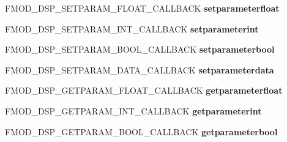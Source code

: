 \begin{DoxyCompactItemize}
\item 
\hypertarget{struct_f_m_o_d___d_s_p___d_e_s_c_r_i_p_t_i_o_n_a29e99ce5530bbb8863b877a8fa3ba07f}{F\+M\+O\+D\+\_\+\+D\+S\+P\+\_\+\+S\+E\+T\+P\+A\+R\+A\+M\+\_\+\+F\+L\+O\+A\+T\+\_\+\+C\+A\+L\+L\+B\+A\+C\+K {\bfseries setparameterfloat}}\label{struct_f_m_o_d___d_s_p___d_e_s_c_r_i_p_t_i_o_n_a29e99ce5530bbb8863b877a8fa3ba07f}

\item 
\hypertarget{struct_f_m_o_d___d_s_p___d_e_s_c_r_i_p_t_i_o_n_a2f545fba54c593711a6dd633c1d9d10b}{F\+M\+O\+D\+\_\+\+D\+S\+P\+\_\+\+S\+E\+T\+P\+A\+R\+A\+M\+\_\+\+I\+N\+T\+\_\+\+C\+A\+L\+L\+B\+A\+C\+K {\bfseries setparameterint}}\label{struct_f_m_o_d___d_s_p___d_e_s_c_r_i_p_t_i_o_n_a2f545fba54c593711a6dd633c1d9d10b}

\item 
\hypertarget{struct_f_m_o_d___d_s_p___d_e_s_c_r_i_p_t_i_o_n_a8173e7f35101d5aedd2f8f4933815688}{F\+M\+O\+D\+\_\+\+D\+S\+P\+\_\+\+S\+E\+T\+P\+A\+R\+A\+M\+\_\+\+B\+O\+O\+L\+\_\+\+C\+A\+L\+L\+B\+A\+C\+K {\bfseries setparameterbool}}\label{struct_f_m_o_d___d_s_p___d_e_s_c_r_i_p_t_i_o_n_a8173e7f35101d5aedd2f8f4933815688}

\item 
\hypertarget{struct_f_m_o_d___d_s_p___d_e_s_c_r_i_p_t_i_o_n_a8f55fa30236a5117cec1d18622b4ffc1}{F\+M\+O\+D\+\_\+\+D\+S\+P\+\_\+\+S\+E\+T\+P\+A\+R\+A\+M\+\_\+\+D\+A\+T\+A\+\_\+\+C\+A\+L\+L\+B\+A\+C\+K {\bfseries setparameterdata}}\label{struct_f_m_o_d___d_s_p___d_e_s_c_r_i_p_t_i_o_n_a8f55fa30236a5117cec1d18622b4ffc1}

\item 
\hypertarget{struct_f_m_o_d___d_s_p___d_e_s_c_r_i_p_t_i_o_n_a50888c2a42b0a95ed7bcfb9488ec8d4f}{F\+M\+O\+D\+\_\+\+D\+S\+P\+\_\+\+G\+E\+T\+P\+A\+R\+A\+M\+\_\+\+F\+L\+O\+A\+T\+\_\+\+C\+A\+L\+L\+B\+A\+C\+K {\bfseries getparameterfloat}}\label{struct_f_m_o_d___d_s_p___d_e_s_c_r_i_p_t_i_o_n_a50888c2a42b0a95ed7bcfb9488ec8d4f}

\item 
\hypertarget{struct_f_m_o_d___d_s_p___d_e_s_c_r_i_p_t_i_o_n_a4dbf5dfd6b3b972456d7843fa32cd2be}{F\+M\+O\+D\+\_\+\+D\+S\+P\+\_\+\+G\+E\+T\+P\+A\+R\+A\+M\+\_\+\+I\+N\+T\+\_\+\+C\+A\+L\+L\+B\+A\+C\+K {\bfseries getparameterint}}\label{struct_f_m_o_d___d_s_p___d_e_s_c_r_i_p_t_i_o_n_a4dbf5dfd6b3b972456d7843fa32cd2be}

\item 
\hypertarget{struct_f_m_o_d___d_s_p___d_e_s_c_r_i_p_t_i_o_n_a0667147f4214b4040333005911d03d25}{F\+M\+O\+D\+\_\+\+D\+S\+P\+\_\+\+G\+E\+T\+P\+A\+R\+A\+M\+\_\+\+B\+O\+O\+L\+\_\+\+C\+A\+L\+L\+B\+A\+C\+K {\bfseries getparameterbool}}\label{struct_f_m_o_d___d_s_p___d_e_s_c_r_i_p_t_i_o_n_a0667147f4214b4040333005911d03d25}


\end{DoxyCompactItemize}
